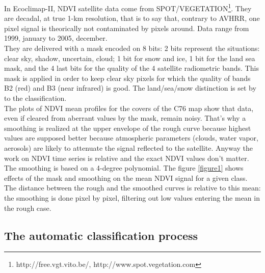 In Ecoclimap-II, NDVI satellite data come from SPOT/VEGETATION\footnote{http://free.vgt.vito.be/, http://www.spot.vegetation.com}. 
They are decadal, at true 1-km resolution, that 
is to say that, contrary to AVHRR, one pixel signal is theorically not contaminated by pixels around. Data range from 1999, january to 2005, december.\\ 
They are delivered with a mask encoded on 8 bits: 2 bits represent the situations: clear sky, shadow, uncertain, cloud; 
1 bit for snow and ice, 
1 bit for the land sea mask, and the 4 last bits for the quality of the 4 satellite radiometric bands. This mask is applied in order to keep clear sky 
pixels for which the quality of bands B2 (red) and B3 (near infrared) is good. The land/sea/snow distinction is set by to the classification.\\ 
The plots of NDVI mean profiles for the covers of the C76 map show that data, even if cleared from aberrant values by the mask, remain noisy. 
That's why a smoothing is realized at the upper envelope of the rough curve because highest values are supposed better because atmospheric parameters 
(clouds, water vapor, aerosols) are likely to attenuate the signal reflected to the satellite. Anyway the work on NDVI time series is relative and 
the exact NDVI values don't matter. The smoothing is based on a 4-degree polynomial. 
The figure \ref{figure1} shows effects of the mask and smoothing on the mean NDVI signal for a given class. The distance between the rough and the 
smoothed curves is relative to this mean: the smoothing is done pixel by pixel, filtering out low values entering the mean in the rough case. 

\subsection{The automatic classification process}\label{classif}

